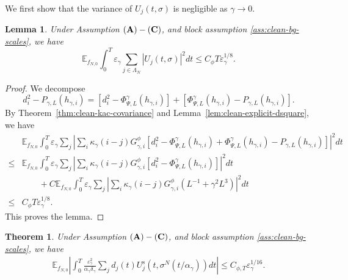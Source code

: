 \documentclass{article}
\newtheorem{theorem}{Theorem}
\newtheorem{lemma}{Lemma}
\begin{document}
We first show that the variance of $U_j(t,\sigma)$ is negligible as $\gamma \to 0$.

\begin{lemma}\label{lem:clean-chain-rule-variance}
Under Assumption \(({\bf A})-({\bf C})\), and block assumption \eqref{ass:clean-bg-scales}, we have
\begin{equation}\label{eq:three-step-P-variance}
    \mathbb E_{f_{N,0}}
\int_0^T\varepsilon_\gamma \sum_{j \in \Lambda_N} \left| U_j(t,\sigma) \right|^2dt \le
C_\phi T \varepsilon^{1/8}_{\gamma}.
\end{equation}
\end{lemma}

\begin{proof}
We decompose
\[
d_i^2- P_{\gamma,L}(h_{\gamma,i})
=
\left[d_i^2-\Phi_{\Psi,L}^{\gamma}(h_{\gamma,i})\right]
+
\left[\Phi_{\Psi,L}^{\gamma}(h_{\gamma,i})-P_{\gamma,L}(h_{\gamma,i})\right].
\]
By Theorem~\ref{thm:clean-kac-covariance} and Lemma~\ref{lem:clean-explicit-dsquare}, we have
\begin{align}\label{eq:kace1}
   & \mathbb E_{f_{N,0}}\int_0^T\varepsilon_\gamma \sum_j \left| \sum_i
\kappa_\gamma(i-j)G_{\gamma,i}^{\phi} \left[d_i^2-\Phi_{\Psi,L}^{\gamma}(h_{\gamma,i})
+ \Phi_{\Psi,L}^{\gamma}(h_{\gamma,i})-P_{\gamma,L}(h_{\gamma,i}) \right]\right|^2dt\nonumber \\
  \le  & \mathbb E_{f_{N,0}}\int_0^T\varepsilon_\gamma \sum_j \left| \sum_i
\kappa_\gamma(i-j)G_{\gamma,i}^{\phi} \left[ d_i^2-\Phi_{\Psi,L}^{\gamma}(h_{\gamma,i}) \right]\right|^2dt \nonumber \\
 & \qquad + C\mathbb E_{f_{N,0}}\int_0^T\varepsilon_\gamma \sum_j \left| \sum_i
\kappa_\gamma(i-j)G_{\gamma,i}^{\phi} \left( L^{-1}+\gamma^2L^3 \right)\right|^2dt \nonumber \\
\le & C_\phi T \varepsilon^{1/8}_{\gamma}.
\end{align}
This proves the lemma.
\end{proof}

\begin{theorem}\label{thm:clean-microscopic-gradient}
Under Assumption \(({\bf A})-({\bf C})\), and block assumption \eqref{ass:clean-bg-scales}, we have
\begin{align}\label{eq:Esymm}
   \mathbb E_{f_{N,0}}
\left| \int_0^T
\frac{\varepsilon_\gamma^2}{\alpha_\gamma\delta_\gamma}
\sum_jd_j(t)U_j^{\mathrm s}(t,\sigma^N(t/\alpha_\gamma))dt
\right| \le C_{\phi,T}\varepsilon_\gamma^{1/16}.
\end{align}
\end{theorem}
\end{document}
